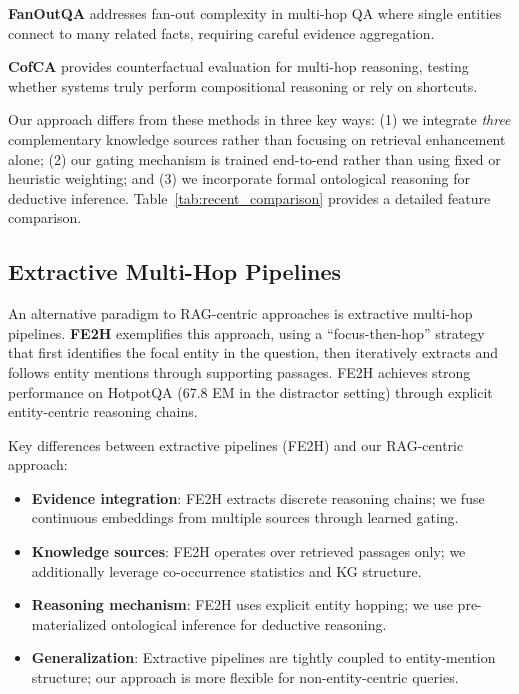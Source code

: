 \documentclass[10pt,twocolumn]{article}
\begin{document}
\textbf{FanOutQA} \cite{zhu2024fanoutqa} addresses fan-out complexity in multi-hop QA where single entities connect to many related facts, requiring careful evidence aggregation.

\textbf{CofCA} \cite{wu2024cofca} provides counterfactual evaluation for multi-hop reasoning, testing whether systems truly perform compositional reasoning or rely on shortcuts.

Our approach differs from these methods in three key ways: (1) we integrate \textit{three} complementary knowledge sources rather than focusing on retrieval enhancement alone; (2) our gating mechanism is trained end-to-end rather than using fixed or heuristic weighting; and (3) we incorporate formal ontological reasoning for deductive inference. Table~\ref{tab:recent_comparison} provides a detailed feature comparison.

\subsection{Extractive Multi-Hop Pipelines}
\label{sec:extractive_pipelines}

An alternative paradigm to RAG-centric approaches is extractive multi-hop pipelines. \textbf{FE2H} \cite{li2022fe2h} exemplifies this approach, using a ``focus-then-hop'' strategy that first identifies the focal entity in the question, then iteratively extracts and follows entity mentions through supporting passages. FE2H achieves strong performance on HotpotQA (67.8 EM in the distractor setting) through explicit entity-centric reasoning chains.

Key differences between extractive pipelines (FE2H) and our RAG-centric approach:

\begin{itemize}
    \item \textbf{Evidence integration}: FE2H extracts discrete reasoning chains; we fuse continuous embeddings from multiple sources through learned gating.
    \item \textbf{Knowledge sources}: FE2H operates over retrieved passages only; we additionally leverage co-occurrence statistics and KG structure.
    \item \textbf{Reasoning mechanism}: FE2H uses explicit entity hopping; we use pre-materialized ontological inference for deductive reasoning.
    \item \textbf{Generalization}: Extractive pipelines are tightly coupled to entity-mention structure; our approach is more flexible for non-entity-centric queries.
\end{itemize}
\end{document}
